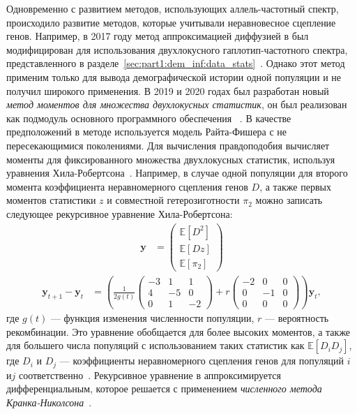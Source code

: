 Одновременно с развитием методов, использующих аллель-частотный спектр, происходило развитие методов, которые учитывали неравновесное сцепление генов.
Например, в 2017 году метод аппроксимацией диффузией в \dadi был модифицирован для использования двухлокусного гаплотип-частотного спектра, представленного в разделе~\ref{sec:part1:dem_inf:data_stats}~\cite{ragsdale2017inferring}.
Однако этот метод применим только для вывода демографической истории одной популяции и не получил широкого применения.
В 2019 и 2020 годах был разработан новый \emph{метод моментов для множества двухлокусных статистик}, он был реализован как подмодуль \momentsLD основного программного обеспечения \moments~\cite{ragsdale2019models}.
В качестве предположений в методе используется модель Райта-Фишера с не пересекающимися поколениями.
Для вычисления правдоподобия \momentsLD вычисляет моменты для фиксированного множества двухлокусных статистик, используя уравнения Хила-Робертсона~\cite{hill1966effect}.
Например, в случае одной популяции для второго момента коэффициента неравномерного сцепления генов $D$, а также первых моментов статистики $z$ и совместной гетерозиготности $\pi_2$ можно записать следующее рекурсивное уравнение Хила-Робертсона:
\begin{align*}
    \mathbf{y} &=
    \begin{pmatrix}
          \mathbb{E}[D^2] \\
          \mathbb{E}[Dz] \\
          \mathbb{E}[\pi_2]
    \end{pmatrix}
\end{align*}
\begin{align*}
    \mathbf{y}_{t+1} - \mathbf{y}_t &= \left(
    \frac{1}{2g(t)}
    \begin{pmatrix}
          -3 & 1 & 1 \\
          4 & -5 & 0 \\
          0 & 1 & -2
    \end{pmatrix}
    + r
    \begin{pmatrix}
          -2 & 0 & 0 \\
          0 & -1 & 0 \\
          0 & 0 & 0
    \end{pmatrix}
    \right) \mathbf{y}_t,
\end{align*}
где $g(t)$ --- функция изменения численности популяции, $r$ --- вероятность рекомбинации.
Это уравнение обобщается для более высоких моментов, а также для большего числа популяций с использованием таких статистик как $\mathbb{E}[D_i D_j]$, где $D_i$ и $D_j$ --- коэффициенты неравномерного сцепления генов для популяций $i$ и$j$ соответственно~\cite{ragsdale2019models}.
Рекурсивное уравнение в \momentsLD аппроксимируется дифференциальным, которое решается с применением \textit{численного метода Кранка-Николсона}~\cite{crank1947practical}.

